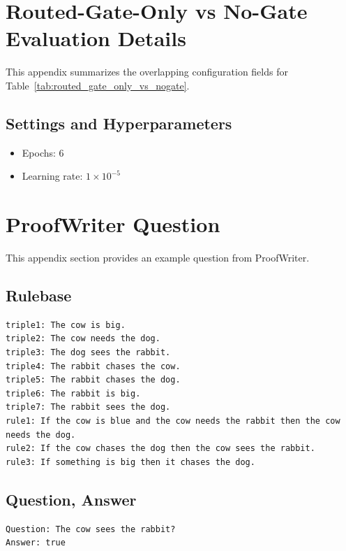 \documentclass[10pt,twocolumn,letterpaper]{article}
\begin{document}
\section{Routed-Gate-Only vs No-Gate Evaluation Details}
This appendix summarizes the overlapping configuration fields for
Table~\ref{tab:routed_gate_only_vs_nogate}.

\subsection{Settings and Hyperparameters}
\begin{itemize}
\item Epochs: 6
\item Learning rate: $1\times10^{-5}$
\end{itemize}

\section{ProofWriter Question}
This appendix section provides an example question from ProofWriter.

\subsection{Rulebase}
\begin{verbatim}
triple1: The cow is big.
triple2: The cow needs the dog.
triple3: The dog sees the rabbit.
triple4: The rabbit chases the cow.
triple5: The rabbit chases the dog.
triple6: The rabbit is big.
triple7: The rabbit sees the dog.
rule1: If the cow is blue and the cow needs the rabbit then the cow needs the dog.
rule2: If the cow chases the dog then the cow sees the rabbit.
rule3: If something is big then it chases the dog.
\end{verbatim}

\subsection{Question, Answer}
\begin{verbatim}
Question: The cow sees the rabbit?
Answer: true
\end{verbatim}
\end{document}
